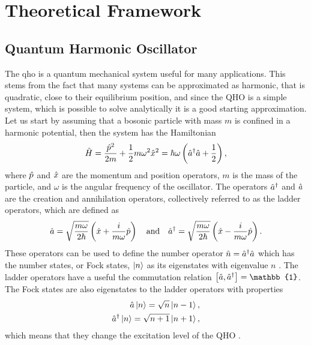\section{Theoretical Framework}
\subsection{Quantum Harmonic Oscillator} \label{sec:qho}
The \gls{qho} is a quantum mechanical system useful for many applications. This stems from the fact that many systems can be approximated as harmonic, that is quadratic, close to their equilibrium position, and since the QHO is a simple system, which is possible to solve analytically it is a good starting approximation. Let us start by assuming that a bosonic particle with mass $m$ is confined in a harmonic potential, then the system has the Hamiltonian
\begin{equation}
    \hat{H} = \frac{\hat{p}^2}{2m} + \frac{1}{2}m\omega^2\hat{x}^2 = \hbar\omega\left(\hat{a}^{\dagger}\hat{a} + \frac{1}{2}\right), \label{eq:hamiltonian}
\end{equation}
where $\hat{p}$ and $\hat{x}$ are the momentum and position operators, $m$ is the mass of the particle, and $\omega$ is the angular frequency of the oscillator. The operators $\hat{a}^{\dagger}$ and $\hat{a}$ are the creation and annihilation operators, collectively referred to as the ladder operators, which are defined as
\begin{equation}
    \hat{a} = \sqrt{\frac{m\omega}{2\hbar}} \left(\hat{x} + \frac{i}{m\omega} \hat{p}\right) \quad \text{and} \quad \hat{a}^{\dagger} = \sqrt{\frac{m\omega}{2\hbar}} \left(\hat{x} - \frac{i}{m\omega} \hat{p}\right).
\end{equation}
These operators can be used to define the number operator $\hat{n} = \hat{a}^{\dagger}\hat{a}$ which has the number states, or Fock states, $\ket{n}$ as its eigenstates with eigenvalue $n$ \cite{Meystre:2021}. The ladder operators have a useful the commutation relation $\comm{\a}{\ad} = \mathbb{1}$. The Fock states are also eigenstates to the ladder operators with properties
\begin{align}
    \hat{a} \ket{n} = \sqrt{n} \ket{n-1},\\
    \hat{a}^{\dagger} \ket{n} = \sqrt{n+1} \ket{n+1},
\end{align}
which means that they change the excitation level of the QHO \cite{Meystre:2021}.

